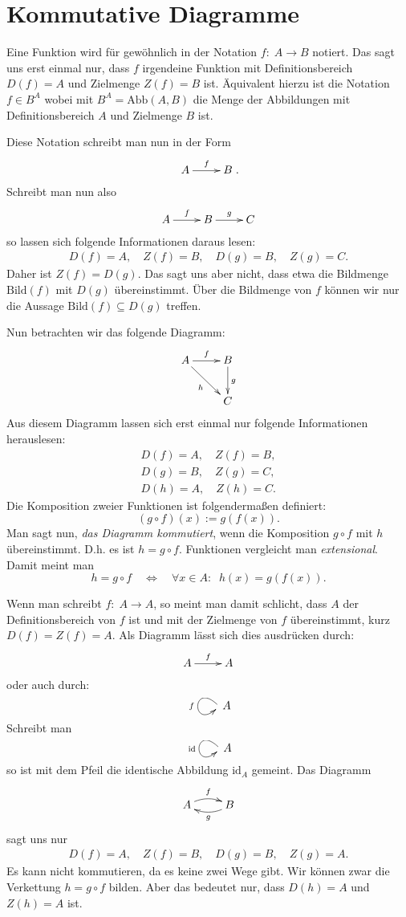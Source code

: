 \documentclass[a4paper,12pt,fleqn]{article}
\begin{document}
\section*{Kommutative Diagramme}

Eine Funktion wird für gewöhnlich in der Notation
$f{:}\;A\rightarrow B$ notiert. Das sagt uns erst einmal nur,
dass $f$ irgendeine Funktion mit Definitionsbereich
$D(f)=A$ und Zielmenge $Z(f)=B$ ist. Äquivalent hierzu ist
die Notation $f{\in}B^A$ wobei mit
$B^A=\mathrm{Abb}(A,B)$ die Menge der Abbildungen mit
Definitionsbereich $A$ und Zielmenge $B$ ist.

Diese Notation schreibt man nun in der Form
\[\xymatrix{A \ar[r]^f & B}.\]
Schreibt man nun also
\[\xymatrix{A \ar[r]^f & B \ar[r]^g & C}\]
so lassen sich folgende Informationen daraus lesen:
\begin{gather*}
D(f)=A,\quad Z(f)=B,\quad D(g)=B,\quad Z(g)=C.
\end{gather*}
Daher ist $Z(f)=D(g)$. Das sagt uns aber nicht, dass etwa die
Bildmenge $\mathrm{Bild}(f)$ mit $D(g)$ übereinstimmt.
Über die Bildmenge von $f$ können wir nur die Aussage
$\mathrm{Bild}(f)\subseteq D(g)$ treffen.

Nun betrachten wir das folgende Diagramm:
\[\xymatrix{A \ar[r]^f \ar[dr]_h & B\ar[d]^g\\
& C}
\]
Aus diesem Diagramm lassen sich erst einmal nur folgende
Informationen herauslesen:
\begin{gather*}
D(f)=A,\quad Z(f)=B,\\
D(g)=B,\quad Z(g)=C,\\
D(h)=A,\quad Z(h)=C.
\end{gather*}
Die Komposition zweier Funktionen ist folgendermaßen definiert:
\[(g\circ f)(x):=g(f(x)).\]
Man sagt nun, \textit{das Diagramm kommutiert}, wenn die Komposition
$g\circ f$ mit $h$ übereinstimmt. D.h. es ist $h=g\circ f$.
Funktionen vergleicht man \textit{extensional}. Damit meint man
\[h=g\circ f \quad\Longleftrightarrow\quad \forall x{\in}A{:}\;\;
h(x)=g(f(x)).\]

Wenn man schreibt $f{:}\; A\rightarrow A$, so meint man damit
schlicht, dass $A$ der Definitionsbereich von $f$ ist und
mit der Zielmenge von $f$ übereinstimmt, kurz $D(f)=Z(f)=A$. Als Diagramm lässt sich
dies ausdrücken durch:
\[\xymatrix{A\ar[r]^f & A}\]
oder auch durch:
\[\xymatrix{\ar@(ul,dl)_f}A\]
Schreibt man
\[\xymatrix{\ar@(ul,dl)_{\mathrm{id}}}A\]
so ist mit dem Pfeil die identische Abbildung $\mathrm{id}_A$
gemeint. Das Diagramm
\[\xymatrix{A \ar@/^/[r]^f & \ar@/^/[l]^g B}\]
sagt uns nur
\begin{gather*}
D(f)=A,\quad Z(f)=B,\quad D(g)=B,\quad Z(g)=A.
\end{gather*}
Es kann nicht kommutieren, da es keine zwei Wege gibt.
Wir können zwar die Verkettung $h=g\circ f$ bilden. Aber das
bedeutet nur, dass $D(h)=A$ und $Z(h)=A$ ist.
\end{document}
